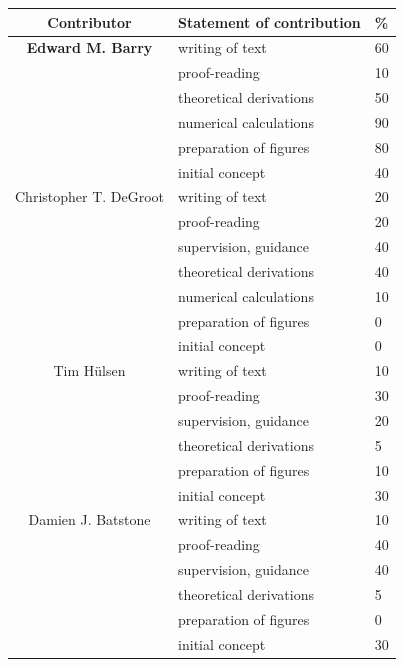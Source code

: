 \cleartoevenpage
\pagestyle{empty}	%

\noindent


\begin{table}[ht]
	\begin{center}
	\begin{tabular}{|c|l|l|}
		\hline
		Contributor & Statement of contribution & \% \\
		\hline
		\textbf{Edward M. Barry}	    & writing of text 			& 60\\
										& proof-reading				& 10 \\
										& theoretical derivations 	& 50 \\
										& numerical calculations 	& 90 \\
										& preparation of figures 	& 80 \\
										& initial concept			& 40 \\
		\hline
		Christopher T. DeGroot			& writing of text 			& 20\\
										& proof-reading				& 20 \\
										& supervision, guidance 	& 40\\
										& theoretical derivations 	& 40\\
                                        & numerical calculations & 10 \\
										& preparation of figures 	& 0 \\
										& initial concept			& 0 \\
		\hline
		Tim H\"{u}lsen		    		& writing of text 			& 10\\
										& proof-reading				& 30 \\
										& supervision, guidance 	& 20 \\
										& theoretical derivations 	& 5 \\
										& preparation of figures 	& 10 \\
										& initial concept			& 30 \\
		\hline
		Damien J. Batstone	    		& writing of text 			& 10\\
										& proof-reading				& 40 \\
										& supervision, guidance 	& 40 \\
										& theoretical derivations 	& 5 \\
										& preparation of figures 	&  0\\
										& initial concept			& 30 \\
		\hline
	\end{tabular}
	\end{center}
\end{table}

